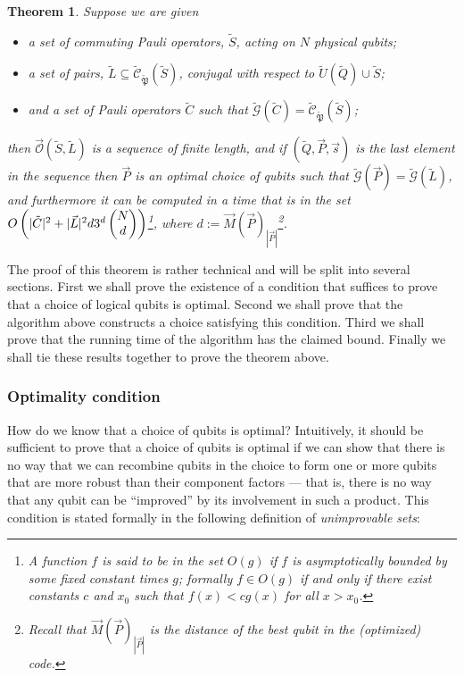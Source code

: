 \documentclass[twocolumn,showpacs,preprintnumbers,amsmath,amssymb,nofootinbib,pra,floatfix]{revtex4-1}
\newtheorem{theorem}{Theorem}
\newcommand{\lst}{\vec}
\newcommand{\set}{\tilde}
\newcommand{\genfun}{\tilde{\mathcal{G}}}
\newcommand{\pauligroup}{{\set{\mathfrak{P}}}}
\newcommand{\centralizer}{\set{\mathcal{C}}}
\newcommand{\optimizer}{\lst{\mathcal{O}}}
\begin{document}
\begin{theorem}
\label{theorem:optimization procedure}
Suppose we are given
\begin{itemize}
\item a set of commuting Pauli operators, $\set S$, acting on $N$ physical qubits;
\item a set of pairs, $\set L\subseteq\centralizer_\pauligroup(\set S)$, conjugal with respect to $\set U(\set Q)\cup\set S$;
\item and a set of Pauli operators $\set C$ such that $\genfun(\set C)=\centralizer_\pauligroup(\set S)$;
\end{itemize}
then $\optimizer(\set S,\set L)$ is a sequence of finite length, and if $(\set Q,\lst P,\lst s)$ is the last element in the sequence then $\lst P$ is an optimal choice of qubits such that $\genfun(\lst P)=\genfun(\set L)$, and furthermore it can be computed in a time that is in the set $O\paren{|\set C|^2+|\lst L|^2d3^d\choose{N}{d}}$\footnote{A function $f$ is said to be in the set $O(g)$ if $f$ is asymptotically bounded by some fixed constant times $g$;  formally $f\in O(g)$ if and only if there exist constants $c$ and $x_0$ such that $f(x)<c g(x)$ for all $x>x_0$.}, where $d:=\lst M(\lst P)_{|\lst P|}$\footnote{Recall that $\lst M(\lst P)_{|\lst P|}$ is the distance of the best qubit in the (optimized) code.}.
\end{theorem}

The proof of this theorem is rather technical and will be split into several sections.  First we shall prove the existence of a condition that suffices to prove that a choice of logical qubits is optimal.   Second we shall prove that the algorithm above constructs a choice satisfying this condition.  Third we shall prove that the running time of the algorithm has the claimed bound.  Finally we shall tie these results together to prove the theorem above.

\subsubsection{Optimality condition}

\label{optimal-generators}

How do we know that a choice of qubits is optimal?  Intuitively, it should be sufficient to prove that a choice of qubits is optimal if we can show that there is no way that we can recombine qubits in the choice to form one or more qubits that are more robust than their component factors --- that is, there is no way that any qubit can be ``improved'' by its involvement in such a product.  This condition is stated formally in the following definition of \emph{unimprovable sets}:
\end{document}
